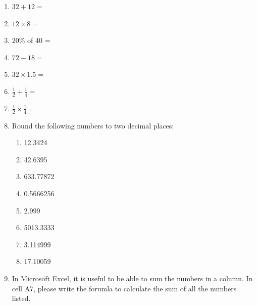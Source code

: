 \documentclass[a4paper]{article}
\begin{document}
\begin{enumerate}
\item \begin{math}  32 + 12 = \end{math} 
\item \begin{math}  12 \times 8 = \end{math} 
\item   20\%  of 40 = 
\item \begin{math}  72 - 18 = \end{math} 
\item \begin{math}  32 \times 1.5 = \end{math} 
\item \begin{math}  \frac{1}{2} + \frac{1}{4} = \end{math}
\item \begin{math}  \frac{1}{2} \times \frac{1}{4} = \end{math}
\item Round the following numbers to two decimal places: 
  \begin{enumerate}\addtolength{\itemsep}{1\baselineskip}
    \item 12.3424 
    \item 42.6395 
    \item 633.77872 
    \item 0.5666256 
    \item 2.999 
    \item 5013.3333 
    \item 3.114999 
    \item 17.10059 
  \end{enumerate} 
\item In Microsoft Excel, it is useful to be able to sum the numbers in a column. In cell A7, please write the forumla to calculate the sum of all the numbers listed.


\end{enumerate}
\end{document}
